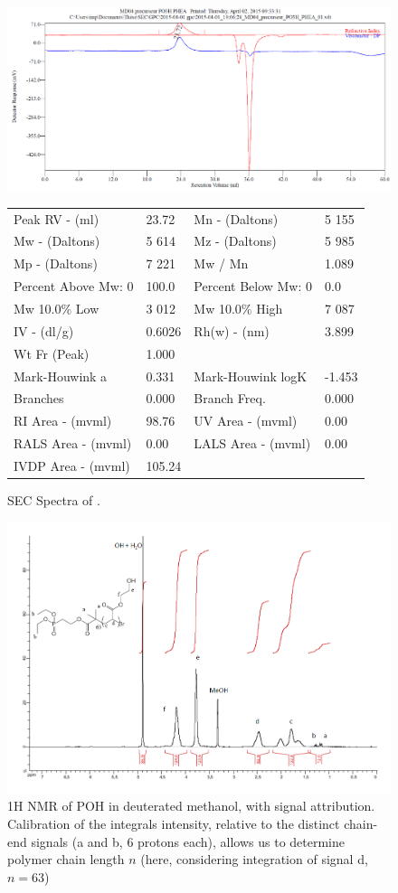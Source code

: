 \documentclass[journal=jacsat,manuscript=article]{achemso}
\begin{document}
\begin{figure}
\includegraphics[width=\textwidth]{sec_spectra.png}
\begin{tabular}{llll}
Peak RV - (ml) & 23.72 & 
Mn - (Daltons) & 5 155 \\
Mw - (Daltons) & 5 614 &
Mz - (Daltons) & 5 985 \\
Mp - (Daltons) & 7 221 &
Mw / Mn & 1.089\\
Percent Above Mw: 0 & 100.0 &
Percent Below Mw: 0 & 0.0\\
Mw 10.0\% Low & 3 012 &
Mw 10.0\% High & 7 087\\
IV - (dl/g) & 0.6026 &
Rh(w) - (nm) & 3.899\\
Wt Fr (Peak) & 1.000 &\\
Mark-Houwink a & 0.331&
Mark-Houwink logK & -1.453\\
Branches & 0.000 &
Branch Freq. & 0.000\\
RI Area - (mvml) & 98.76 &
UV Area - (mvml) & 0.00\\
RALS Area - (mvml) & 0.00 &
LALS Area - (mvml) & 0.00\\
IVDP Area - (mvml) & 105.24\\
\end{tabular}
\caption{SEC Spectra of .}
\label{fig:sec}
\end{figure}

\begin{figure}
\includegraphics[width=\textwidth]{POH_1H_NMR.png}
\caption{1H NMR of POH in deuterated methanol, with signal attribution. Calibration of the integrals intensity, relative to the distinct chain-end signals (a and b, 6 protons each), allows us to determine polymer chain length $n$ (here, considering integration of signal d, $n=63$)}
\end{figure}
\end{document}
